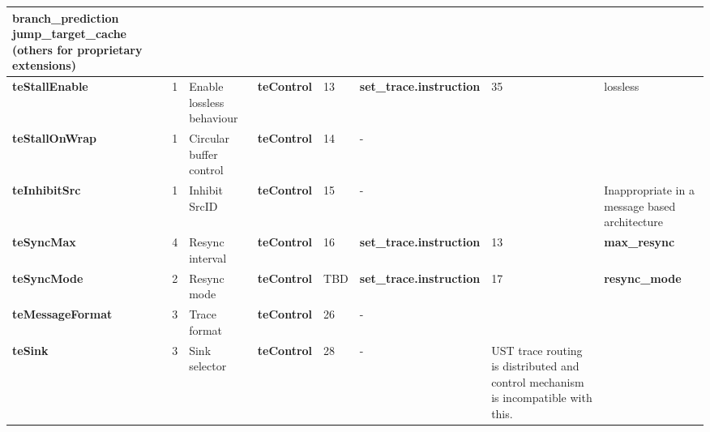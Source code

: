 \begin{table}[htp]
\begin{tabulary}{\textwidth}{|l|l|p{15mm}|l|p{10mm}|l|p{15mm}|p{15mm}}
    \textbf{branch\_prediction}\newline
    \textbf{jump\_target\_cache}\newline
    (others for proprietary extensions)\\
    \hline
    \textbf{teStallEnable} & 1 & Enable lossless behaviour & \textbf{teControl} & 13 & \textbf{set\_trace.instruction} & 35 & lossless\\
    \hline
    \textbf{teStallOnWrap} & 1 & Circular buffer control & \textbf{teControl} & 14	& - & \\
    \hline
    \textbf{teInhibitSrc} & 1 & Inhibit SrcID & \textbf{teControl} & 15 & - & &  Inappropriate in a message based architecture \\
    \hline
    \textbf{teSyncMax} & 4 & Resync interval & \textbf{teControl} & 16 & \textbf{set\_trace.instruction} & 13 & \textbf{max\_resync}\\
    \hline
    \textbf{teSyncMode} & 2 &Resync mode & \textbf{teControl} & TBD & \textbf{set\_trace.instruction} & 17 & \textbf{resync\_mode} \\
    \hline
    \textbf{teMessageFormat} & 3 & Trace format & \textbf{teControl} & 26 & - & & \\
    \hline
    \textbf{teSink} & 3 & Sink selector & \textbf{teControl} & 28 & - & UST trace routing is distributed and control mechanism is incompatible with this.\\
    \hline
  \end{tabulary}
\end{table}



